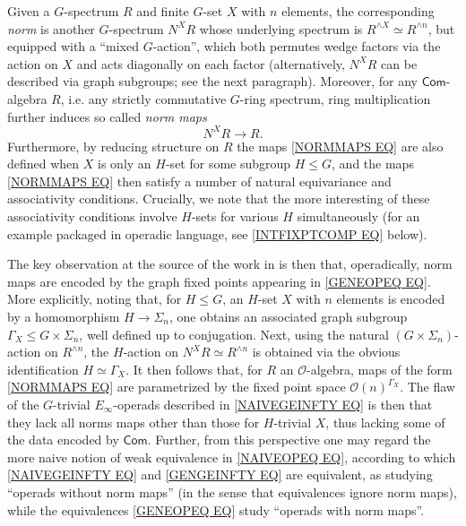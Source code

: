 \documentclass[a4paper,10pt
,draft
]{article}%
\numberwithin{equation}{section}
\numberwithin{figure}{section}
\theoremstyle{definition} %
\newcommand{\1}{\ensuremath{\mathbbm 1}}%
\begin{document}
Given a $G$-spectrum $R$ and finite $G$-set $X$ with $n$ elements, 
the corresponding \textit{norm} is another $G$-spectrum $N^X R$
whose underlying spectrum is 
$R^{\wedge X} \simeq R^{\wedge n}$,
but equipped with a ``mixed $G$-action'',
which both permutes wedge factors via the action on $X$ 
and acts diagonally on each factor
(alternatively, $N^X R$ can be described via graph subgroups; see the next paragraph).
Moreover, for any $\mathsf{Com}$-algebra $R$, i.e.
any strictly commutative $G$-ring spectrum, 
ring multiplication further induces so called \textit{norm maps}
\begin{equation}\label{NORMMAPS EQ}
	N^X \! R \to R.
\end{equation}
Furthermore, by reducing structure on $R$ the maps \eqref{NORMMAPS EQ} are also defined when $X$ is only an $H$-set for some subgroup $H \leq G$, and the maps \eqref{NORMMAPS EQ}
then satisfy a number of 
natural equivariance and associativity conditions.
Crucially,  we note that the more interesting of these associativity conditions involve $H$-sets for various $H$ simultaneously
(for an example packaged in operadic language,
see \eqref{INTFIXPTCOMP EQ} below).

The key observation at the source of the work in 
\cite{BH15} is then that, operadically, 
norm maps are encoded by the graph fixed points 
appearing in \eqref{GENEOPEQ EQ}.
More explicitly, noting that, for $H \leq G$, an $H$-set $X$ with $n$ elements 
is encoded by a
homomorphism 
$H \to \Sigma_n$,
one obtains an associated graph subgroup
$\Gamma_X \leq G \times \Sigma_n$,
well defined up to conjugation. 
Next,
using the natural 
$(G \times \Sigma_n)$-action on $R^{\wedge n}$,
the $H$-action on $N^X R \simeq R^{\wedge n}$
is obtained via the obvious identification
$H \simeq \Gamma_X$.
%
It then follows that, for $R$ an 
$\mathcal{O}$-algebra, maps of the form \eqref{NORMMAPS EQ}
are parametrized by the fixed point space
$\mathcal{O}(n)^{\Gamma_X}$.
The flaw of the $G$-trivial $E_{\infty}$-operads
described in \eqref{NAIVEGEINFTY EQ} is then that they lack all norms maps other than those for $H$-trivial $X$, thus lacking 
some of the data encoded by $\mathsf{Com}$.
Further, from this perspective one may regard the more naive notion of weak equivalence in \eqref{NAIVEOPEQ EQ},
according to which \eqref{NAIVEGEINFTY EQ} and \eqref{GENGEINFTY EQ} are equivalent,
as studying ``operads without norm maps''
(in the sense that equivalences ignore norm maps), 
while the equivalences \eqref{GENEOPEQ EQ}
study ``operads with norm maps''.
\end{document}

